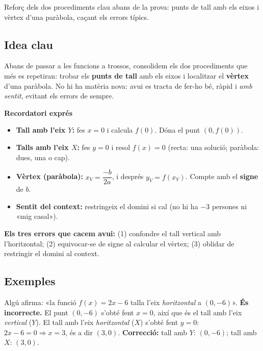 %
{Reforç dels dos procediments clau abans de la prova: punts de tall amb els eixos i vèrtex d'una paràbola, caçant els errors típics.}

\subsection{Idea clau}

Abans de passar a les funcions a trossos, consolidem els dos procediments que més es
repetiran: trobar els \textbf{punts de tall} amb els eixos i localitzar el
\textbf{vèrtex} d'una paràbola. No hi ha matèria nova: avui es tracta de fer-ho bé,
ràpid i \emph{amb sentit}, evitant els errors de sempre.

\begin{idea}
\textbf{Recordatori exprés}
\begin{itemize}[leftmargin=1.4em, itemsep=2pt]
  \item \textbf{Tall amb l'eix $Y$:} fes $x=0$ i calcula $f(0)$. Dóna el punt $(0,f(0))$.
  \item \textbf{Talls amb l'eix $X$:} fes $y=0$ i resol $f(x)=0$ (recta: una solució;
        paràbola: dues, una o cap).
  \item \textbf{Vèrtex (paràbola):} $x_V=\dfrac{-b}{2a}$, i després $y_V=f(x_V)$.
        Compte amb el \textbf{signe} de $b$.
  \item \textbf{Sentit del context:} restringeix el domini si cal (no hi ha
        $-3$ persones ni «mig casal»).
\end{itemize}
\textbf{Els tres errors que cacem avui:} (1) confondre el tall vertical amb
l'horitzontal; (2) equivocar-se de signe al calcular el vèrtex; (3) oblidar de
restringir el domini al context.
\end{idea}

\subsection{Exemples}

\begin{exemple}
Algú afirma: «la funció $f(x)=2x-6$ talla l'eix \emph{horitzontal} a $(0,-6)$».
\textbf{És incorrecte.} El punt $(0,-6)$ s'obté fent $x=0$, així que és el tall amb
l'eix \emph{vertical} ($Y$). El tall amb l'eix \emph{horitzontal} ($X$) s'obté fent
$y=0$: $2x-6=0 \Rightarrow x=3$, és a dir $(3,0)$. \textbf{Correcció:} tall amb $Y$:
$(0,-6)$; tall amb $X$: $(3,0)$.
\end{exemple}

